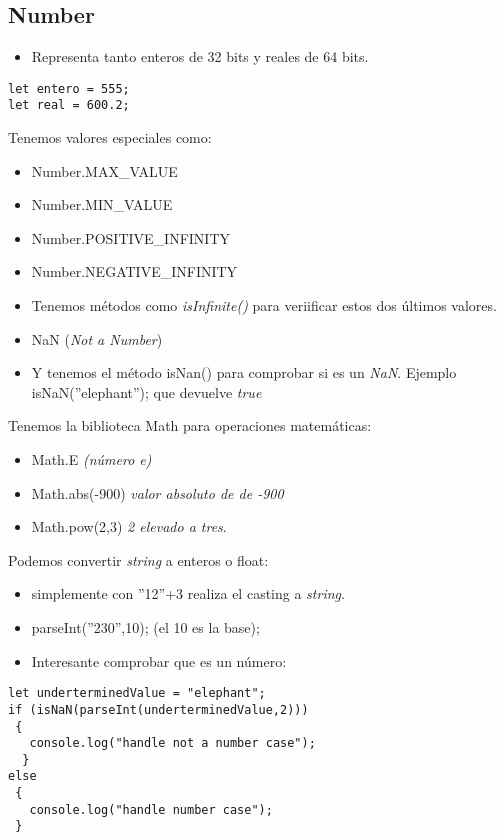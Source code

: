\documentclass[4paper]{article}
\begin{document}
\subsection{Number}
\begin{itemize}
\item Representa tanto enteros de 32 bits y reales de 64 bits.
\end{itemize}
\begin{lstlisting}
let entero = 555;
let real = 600.2;
\end{lstlisting}

Tenemos valores especiales como:
\begin{itemize}
\item Number.MAX\_VALUE
\item Number.MIN\_VALUE
\item Number.POSITIVE\_INFINITY
\item Number.NEGATIVE\_INFINITY
\item Tenemos métodos como \emph{isInfinite()} para veriificar estos dos últimos valores.
\item NaN (\emph{Not a Number})
\item Y tenemos el método isNan() para comprobar si es un \emph{NaN}. Ejemplo isNaN(''elephant''); que devuelve \emph{true}
\end{itemize}
Tenemos la biblioteca Math para operaciones matemáticas:
\begin{itemize}
\item Math.E \textit{(número e)}
\item Math.abs(-900) \textit{valor absoluto de de -900}
\item Math.pow(2,3) \textit{2 elevado a tres}.
\end{itemize}
Podemos convertir \emph{string} a enteros o float:
\begin{itemize}
\item simplemente con ''12''+3 realiza el casting a \emph{string}.
\item parseInt(''230'',10); (el 10 es la base);
\item Interesante comprobar que es un número:
\end{itemize}
\begin{lstlisting}
let underterminedValue = "elephant";
if (isNaN(parseInt(underterminedValue,2)))
 {
   console.log("handle not a number case");
  }
else
 {
   console.log("handle number case");
 }
\end{lstlisting}
\end{document}

